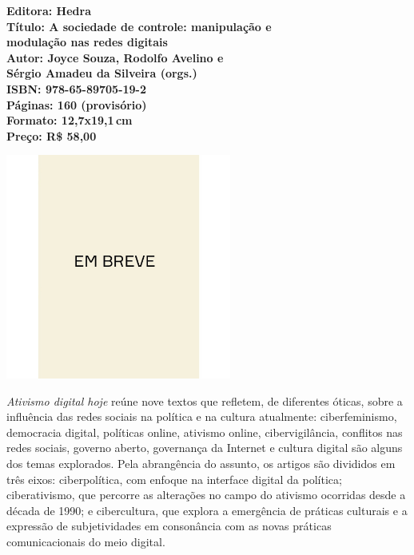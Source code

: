\vfill
\noindent\begin{minipage}[c]{1\linewidth}
{\small\textbf{
\hspace*{-.1cm}Editora: Hedra\\
Título: A sociedade de controle: manipulação e\\modulação nas redes digitais\\
Autor: Joyce Souza, Rodolfo Avelino e\\Sérgio Amadeu da Silveira (orgs.)\\ 
ISBN: 978-65-89705-19-2\\
Páginas: 160 (provisório)\\
Formato: 12,7x19,1\,cm\\
Preço: R\$ 58,00\\
}}
\end{minipage}
\pagebreak

\begin{center}
\hspace*{.5cm}\includegraphics[width=74mm]{./CAPAS/breve.jpeg}
\end{center}
\hspace*{-7cm}\hrulefill\hspace*{-7cm}
\medskip

\noindent{}\textit{Ativismo digital hoje} reúne nove textos que refletem, de diferentes óticas, sobre a influência das redes sociais na política e na cultura atualmente: ciberfeminismo, democracia digital, políticas online, ativismo online, cibervigilância, conflitos nas redes sociais, governo aberto, governança da Internet e cultura digital são alguns dos temas explorados.
Pela abrangência do assunto, os artigos são divididos em três eixos: ciberpolítica, com enfoque na interface digital da política; ciberativismo, que percorre as alterações no campo do ativismo ocorridas desde a década de 1990; e cibercultura, que explora a emergência de práticas culturais e a expressão de subjetividades em consonância com as novas práticas comunicacionais do meio digital.

